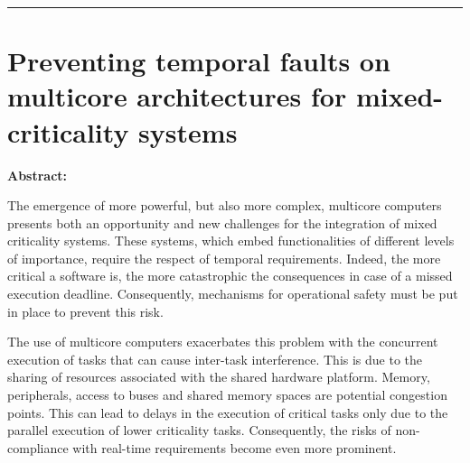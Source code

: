 \documentclass[french, a4paper, 11pt, twoside, pdftex]{StyleThese}
\begin{document}
\begin{vcenterpage}
\noindent\rule[2pt]{\textwidth}{0.5pt}
\section*{Preventing temporal faults on multicore architectures for mixed-criticality systems}
	{\large\textbf{Abstract:}
			
		The emergence of more powerful, but also more complex, multicore computers presents both an opportunity and new challenges for the integration of mixed criticality systems. These systems, which embed functionalities of different levels of importance, require the respect of temporal requirements. Indeed, the more critical a software is, the more catastrophic the consequences in case of a missed execution deadline. Consequently, mechanisms for operational safety must be put in place to prevent this risk. 

		The use of multicore computers exacerbates this problem with the concurrent execution of tasks that can cause inter-task interference. This is due to the sharing of resources associated with the shared hardware platform. Memory, peripherals, access to buses and shared memory spaces are potential congestion points. This can lead to delays in the execution of critical tasks only due to the parallel execution of lower criticality tasks. Consequently, the risks of non-compliance with real-time requirements become even more prominent. %

}
\end{vcenterpage}
\end{document}
